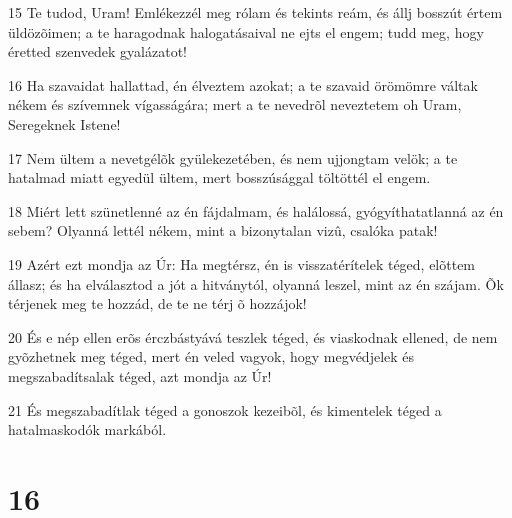 \par 15 Te tudod, Uram! Emlékezzél meg rólam és tekints reám, és állj bosszút értem üldözõimen; a te haragodnak halogatásaival ne ejts el engem; tudd meg, hogy éretted szenvedek gyalázatot!
\par 16 Ha szavaidat hallattad, én élveztem azokat; a te szavaid örömömre váltak nékem és szívemnek vígasságára; mert a te nevedrõl neveztetem oh Uram, Seregeknek Istene!
\par 17 Nem ültem a nevetgélõk gyülekezetében, és nem ujjongtam velök; a te hatalmad miatt egyedül ültem, mert bosszúsággal töltöttél el engem.
\par 18 Miért lett szünetlenné az én fájdalmam, és halálossá, gyógyíthatatlanná az én sebem? Olyanná lettél nékem, mint a bizonytalan vizû, csalóka patak!
\par 19 Azért ezt mondja az Úr: Ha megtérsz, én is visszatérítelek téged, elõttem állasz; és ha elválasztod a jót a hitványtól, olyanná leszel, mint az én szájam. Õk térjenek meg te hozzád, de te ne térj õ hozzájok!
\par 20 És e nép ellen erõs érczbástyává teszlek téged, és viaskodnak ellened, de nem gyõzhetnek meg téged, mert én veled vagyok, hogy megvédjelek és megszabadítsalak téged, azt mondja az Úr!
\par 21 És megszabadítlak téged a gonoszok kezeibõl, és kimentelek téged a hatalmaskodók markából.

\chapter{16}

